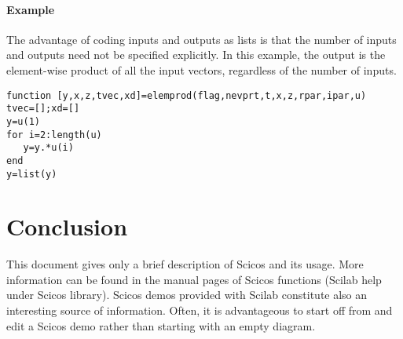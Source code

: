 \documentclass{article}
\begin{document}
\paragraph{Example}
The advantage of coding inputs and outputs as lists is that
the number of inputs and outputs need not be specified
explicitly. In this example, the output is the element-wise
product of all the input vectors, regardless of the number
of inputs.

\begin{verbatim}
function [y,x,z,tvec,xd]=elemprod(flag,nevprt,t,x,z,rpar,ipar,u)
tvec=[];xd=[]
y=u(1)
for i=2:length(u)
   y=y.*u(i)
end
y=list(y)
\end{verbatim}

\section{Conclusion}
This document gives only a brief description of Scicos and its
usage. More information can be found in the manual pages of Scicos
functions (Scilab help under Scicos library). Scicos demos provided with
Scilab constitute also an interesting source of information. Often,
it is advantageous to start off from and edit a Scicos demo rather than
starting with an empty diagram. 
\end{document}
